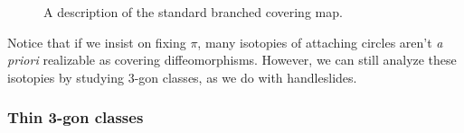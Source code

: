 \documentclass[11pt]{article}
\theoremstyle{plain} \newtheorem{thm}{Theorem}[subsection]
\theoremstyle{plain} \newtheorem{cor}[thm]{Corollary}
\theoremstyle{plain} \newtheorem{prop}[thm]{Proposition}
\theoremstyle{plain} \newtheorem{conj}[thm]{Conjecture}
\theoremstyle{plain} \newtheorem{lem}[thm]{Lemma}
\theoremstyle{definition} \newtheorem{df}[thm]{Definition}
\theoremstyle{remark} \newtheorem{rmk}[thm]{Remark}
\theoremstyle{remark} \newtheorem{obs}[thm]{Observation}
\numberwithin{equation}{section}
\begin{document}
\begin{figure}[h!]
\centering
{}\\
\\
\caption[A standard branched covering map]{A description of the standard branched covering map.}
\end{figure}

Notice that if we insist on fixing $\pi$, many isotopies of attaching circles aren't \emph{a priori} realizable as covering diffeomorphisms.  However, we can still analyze these isotopies by studying 3-gon classes, as we do with handleslides.

\subsubsection{Thin 3-gon classes}
\end{document}
